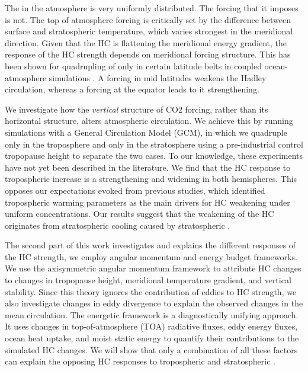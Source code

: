 The \CO{} in the atmosphere is very uniformly distributed. The forcing that it imposes is not. The top of atmosphere forcing is critically set by the difference between surface and stratospheric temperature, which varies strongest in the meridional direction. Given that the HC is flattening the meridional energy gradient, the response of the HC strength depends on meridional forcing structure. This has been shown for quadrupling of \CO{} only in certain latitude belts in coupled ocean-atmosphere simulations \parencite{kimWeakHadleyCell2022}. A forcing in mid latitudes weakens the Hadley circulation, whereas a forcing at the equator leads to it strengthening.

We investigate how the \textit{vertical} structure of CO2 forcing, rather than its horizontal structure, alters atmospheric circulation. We achieve this by running simulations with a General Circulation Model (GCM), in which we quadruple \CO{} only in the troposphere and only in the stratosphere using a pre-industrial control tropopause height to separate the two cases. To our knowledge, these experiments have not yet been described in the literature. We find that the HC response to tropospheric \CO{} increase is a strengthening and widening in both hemispheres. This opposes our expectations evoked from previous studies, which identified tropospheric warming parameters as the main drivers for HC weakening under uniform \CO{} concentrations. Our results suggest that the weakening of the HC originates from stratospheric cooling caused by stratospheric \CO{}.

The second part of this work investigates and explains the different responses of the HC strength, we employ angular momentum and energy budget frameworks. We use the axisymmetric angular momentum framework to attribute HC changes to changes in tropopause height, meridional temperature gradient, and vertical stability. Since this theory ignores the contribution of eddies to HC strength, we also investigate changes in eddy divergence to explain the observed changes in the mean circulation. The energetic framework is a diagnostically unifying approach. It uses changes in top-of-atmosphere (TOA) radiative fluxes, eddy energy fluxes, ocean heat uptake, and moist static energy to quantify their contributions to the simulated HC changes. We will show that only a combination of all these factors can explain the opposing HC responses to tropospheric and stratospheric \CO.


